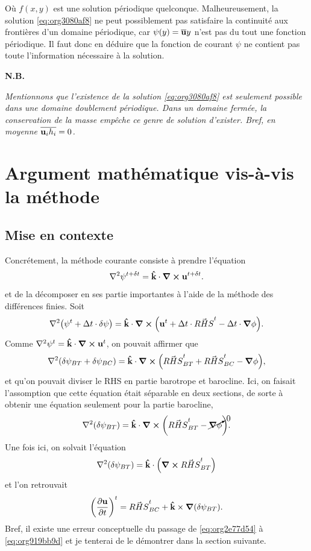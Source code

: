 \documentclass[10pt]{article}
\numberwithin{equation}{section}
\newcommand{\kvf}{\vb{\hat{k}}}
\newcommand{\uu}{\vb{u}}
\begin{document}
Où \(f(x,y)\) est une solution périodique quelconque. 
Malheureusement, la solution \ref{eq:org3080af8} ne peut possiblement pas satisfaire la continuité aux frontières d'un domaine périodique, car \(\psi(y) = \overline{\uu} y\) n'est pas du tout une fonction périodique.
Il faut donc en déduire que la fonction de courant \(\psi\) ne contient pas toute l'information nécessaire à la solution.\bigskip

\textbf{N.B.\ } \begin{minipage}[t]{0.94\linewidth}
   \itshape Mentionnons que l'existence de la solution \ref{eq:org3080af8} est seulement possible dans une domaine doublement périodique.
   Dans un domaine fermée, la conservation de la masse empêche ce genre de solution d'exister. Bref, en moyenne \(\overline{\uu_i h_i} = 0\).
\end{minipage}
\section{Argument mathématique vis-à-vis la méthode}
\label{sec:org31f0d15}

\subsection{Mise en contexte}
\label{sec:org53ff939}
Concrétement, la méthode courante consiste à prendre l'équation
\begin{equation}
   \laplacian{\psi^{t+\delta t}} = \kvf\cdot\curl{\uu^{t+\delta t}}.
\end{equation}
et de la décomposer en ses partie importantes à l'aide de la méthode des différences finies.
Soit
\begin{equation}
   \laplacian(\psi^t + \Delta t\cdot\delta \psi) = \kvf\cdot\curl(\uu^t + \Delta t\cdot\vec{RHS}^t - \Delta t\cdot\gradient{\phi}).
\end{equation}
Comme \(\laplacian{\psi^t} = \kvf\cdot\curl{\uu^t}\), on pouvait affirmer que
\begin{equation}
\label{eq:org2e77d54}
   \laplacian(\delta \psi_{BT} + \delta \psi_{BC}) = \kvf\cdot\curl(\vec{RHS}^t_{BT} + \vec{RHS}^t_{BC} - \gradient{\phi}),
\end{equation}
et qu'on pouvait diviser le RHS en partie barotrope et barocline.
Ici, on faisait l'assomption que cette équation était séparable en deux sections, de sorte à obtenir une équation seulement pour la partie barocline,
\begin{equation}
\label{eq:org919bb9d}
   \laplacian(\delta \psi_{BT}) = \kvf\cdot\curl(\vec{RHS}^t_{BT} - \cancelto{0}{\gradient{\phi}}).
\end{equation}
Une fois ici, on solvait l'équation
\begin{equation}
   \laplacian(\delta \psi_{BT}) = \kvf\cdot\qty(\curl{\vec{RHS}^t_{BT}})
\end{equation}
et l'on retrouvait
\begin{equation}
   \qty(\pdv{\uu}{t})^t = \vec{RHS}^t_{BC} + \kvf\times\gradient(\delta\psi_{BT}).
\end{equation}
Bref, il existe une erreur conceptuelle du passage de \ref{eq:org2e77d54} à \ref{eq:org919bb9d} et je tenterai de le démontrer dans la section suivante.
\end{document}
